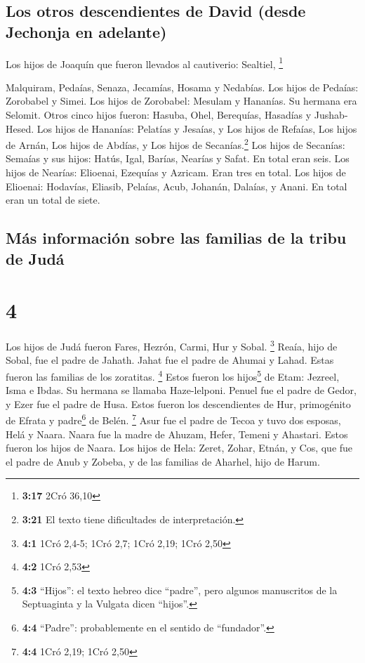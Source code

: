 \hypertarget{los-otros-descendientes-de-david-desde-jechonja-en-adelante}{%
\subsection{Los otros descendientes de David (desde Jechonja en
adelante)}\label{los-otros-descendientes-de-david-desde-jechonja-en-adelante}}

 Los hijos de Joaquín que fueron llevados al cautiverio:
Sealtiel, \footnote{\textbf{3:17} 2Cró 36,10}

 Malquiram, Pedaías, Senaza, Jecamías, Hosama y Nedabías.
 Los hijos de Pedaías: Zorobabel y Simei. Los hijos de
Zorobabel: Mesulam y Hananías. Su hermana era Selomit. 
Otros cinco hijos fueron: Hasuba, Ohel, Berequías, Hasadías y
Jushab-Hesed.  Los hijos de Hananías: Pelatías y Jesaías,
y Los hijos de Refaías, Los hijos de Arnán, Los hijos de Abdías, y Los
hijos de Secanías.\footnote{\textbf{3:21} El texto tiene dificultades de
  interpretación.}  Los hijos de Secanías: Semaías y sus
hijos: Hatús, Igal, Barías, Nearías y Safat. En total eran seis.
 Los hijos de Nearías: Elioenai, Ezequías y Azricam. Eran
tres en total.  Los hijos de Elioenai: Hodavías, Eliasib,
Pelaías, Acub, Johanán, Dalaías, y Anani. En total eran un total de
siete.

\hypertarget{muxe1s-informaciuxf3n-sobre-las-familias-de-la-tribu-de-juduxe1}{%
\subsection{Más información sobre las familias de la tribu de
Judá}\label{muxe1s-informaciuxf3n-sobre-las-familias-de-la-tribu-de-juduxe1}}

\hypertarget{section-3}{%
\section{4}\label{section-3}}

 Los hijos de Judá fueron Fares, Hezrón, Carmi, Hur y
Sobal. \footnote{\textbf{4:1} 1Cró 2,4-5; 1Cró 2,7; 1Cró 2,19; 1Cró 2,50}
 Reaía, hijo de Sobal, fue el padre de Jahath. Jahat fue
el padre de Ahumai y Lahad. Estas fueron las familias de los zoratitas.
\footnote{\textbf{4:2} 1Cró 2,53}  Estos fueron los
hijos\footnote{\textbf{4:3} ``Hijos'': el texto hebreo dice ``padre'',
  pero algunos manuscritos de la Septuaginta y la Vulgata dicen
  ``hijos''.} de Etam: Jezreel, Isma e Ibdas. Su hermana se llamaba
Haze-lelponi.  Penuel fue el padre de Gedor, y Ezer fue el
padre de Husa. Estos fueron los descendientes de Hur, primogénito de
Efrata y padre\footnote{\textbf{4:4} ``Padre'': probablemente en el
  sentido de ``fundador''.} de Belén. \footnote{\textbf{4:4} 1Cró 2,19;
  1Cró 2,50}  Asur fue el padre de Tecoa y tuvo dos
esposas, Helá y Naara.  Naara fue la madre de Ahuzam,
Hefer, Temeni y Ahastari. Estos fueron los hijos de Naara.
 Los hijos de Hela: Zeret, Zohar, Etnán,  y
Cos, que fue el padre de Anub y Zobeba, y de las familias de Aharhel,
hijo de Harum.

